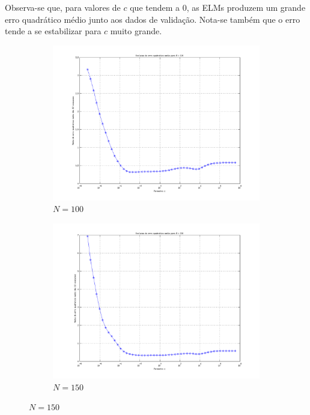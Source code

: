 		\FloatBarrier
		
	
		\newpage
		
		Observa-se que, para valores de \(c\) que tendem a
		0, as ELMs produzem um grande erro quadrático médio junto aos dados de
		validação. Nota-se também que o erro tende a se estabilizar para \(c\) muito
		grande.
				
		
		\begin{figure}[H] 
				
			\centering
			
				\begin{subfigure}{.5\textwidth}
				  \centering
				  \includegraphics[width=1\linewidth]{image/elm_100_neurons}
				  \caption{\(N=100\)}
				  \label{fig:elm100}
				\end{subfigure}%
				\begin{subfigure}{.5\textwidth}
				  \centering
				  \includegraphics[width=1\linewidth]{image/elm_150_neurons}
				  \caption{\(N=150\)}
				  \label{fig:elm150}
			\end{subfigure}
			

\end{figure}

